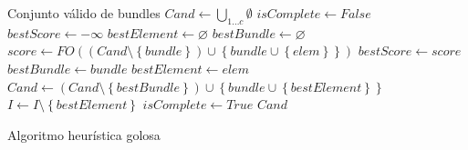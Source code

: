 \begin{algorithm}[H]
\begin{algorithmic}[1]
\ENSURE Conjunto válido de bundles
\STATE $Cand \leftarrow \bigcup_{1 \ldots c}\emptyset$
\STATE $isComplete \leftarrow False$
  \STATE $bestScore \leftarrow -\infty$
  \STATE $bestElement \leftarrow \varnothing$
  \STATE $bestBundle \leftarrow \varnothing$
        \STATE $score \leftarrow FO((Cand \setminus \left\{bundle\right\}) \cup \left\{bundle \cup \left\{elem\right\}\right\})$
          \STATE $bestScore \leftarrow score$
          \STATE $bestBundle \leftarrow bundle$
          \STATE $bestElement \leftarrow elem$
        \ENDIF
      \ENDIF
    \ENDFOR
  \ENDFOR
		\STATE $Cand \leftarrow (Cand \setminus \left\{bestBundle\right\}) \cup \left\{bundle \cup \left\{bestElement\right\}\right\}$
		\STATE $I \leftarrow I \setminus \left\{bestElement\right\}$
	\ELSE
		\STATE $isComplete \leftarrow True$
	\ENDIF
\ENDWHILE
\RETURN $Cand$
\end{algorithmic}
\caption{Algoritmo heurística golosa}\label{alg:algHeuGol}
\end{algorithm}

